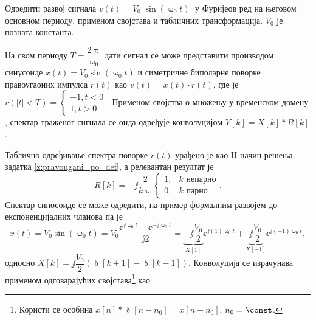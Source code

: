 \PID 
Одредити развој сигнала
$v(t) = V_0 |\sin(\upomega_0 t)|$ у Фуријеов ред на његовом основном периоду, применом 
својстава и табличних трансформација. $V_0$ је позната константа. 

\RESENJE 
На свом периоду $T = \dfrac{2\uppi}{\upomega_0}$ дати сигнал се може представити производом синусоиде 
$x(t) = V_0 \sin(\upomega_0 t)$ 
и симетричне биполарне поворке правоугаоних импулса $r(t)$ као 
$v(t) = x(t) \cdot r(t)$, где је 
$r(|t| < T) = \begin{cases}
    -1, t < 0 \\
    1, t > 0
\end{cases}.$ 
Применом својства о множењу у временском домену , спектар траженог сигнала се 
онда одређује конволуцијом $V[k] = X[k] \ast R[k]$. 

Таблично одређивање спектра поворке $r(t)$ урађено је као II начин решења задатка \ref{z:pravougani_po_def},
а релевантан резултат је 
\begin{equation}
    R[k] = -\jj \dfrac{2}{k\uppi} \begin{cases}
        1, & k\text{ непарно} \\
        0, & k\text{ парно}
    \end{cases}.
\end{equation}
Спектар синосоиде се може одредити, на пример формалним развојем до експоненцијалних чланова па је 
\begin{equation}
    x(t) = V_0\sin(\upomega_0 t) = 
    V_0 \dfrac{\ee^{\jj\upomega_0 t} - \ee^{-\jj\upomega_0 t}}{\jj2} = 
    \underbrace{-\jj\dfrac{V_0}{2}}_{X[1]} \ee^{\jj(1)\upomega_0 t} + \underbrace{\jj\dfrac{V_0}{2}}_{X[-1]} \ee^{\jj(-1)\upomega_0 t} ,
\end{equation}
односно $X[k] = \jj\dfrac{V_0}{2}\left(\updelta[k+1] - \updelta[k-1]\right)$. Конволуција се израчунава 
применом одговарајућих својстава\footnote{Користи се особина 
$x[n] \ast \updelta[n - n_0]  = x[n-n_0]$, $n_0 = \const$.} као 
